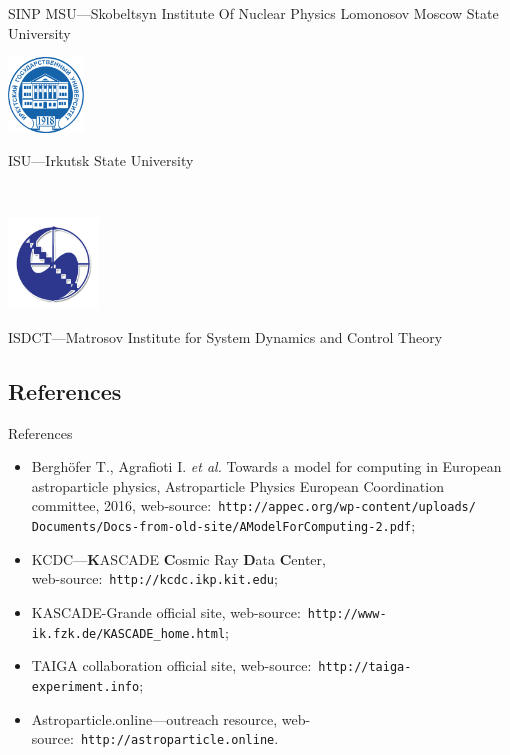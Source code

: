 \documentclass[18pt]{beamer}
\begin{document}
\begin{frame}[allowframebreaks]
{  SINP MSU---Skobeltsyn Institute Of Nuclear Physics Lomonosov Moscow State University
}
\\\vspace{1em}
\parbox{0.20\textwidth}{
  \centering\includegraphics[width=0.15\textwidth]{pics/isu_logo.png}
}\hfill
\parbox{0.75\textwidth}{
  ISU---Irkutsk State University
}
\\\vspace{1em}
\parbox{0.20\textwidth}{
  \centering\includegraphics[width=0.18\textwidth]{pics/matr_logo.png}
}\hfill
\parbox{0.75\textwidth}{
  ISDCT---Matrosov Institute for System Dynamics and Control Theory
}
\end{frame}

\subsection{References}
\begin{frame}{References}
  \begin{itemize}
   \item Berghöfer T., Agrafioti I. \textit{et al.} Towards a model for computing in European astroparticle physics,
   Astroparticle Physics European Coordination committee, 2016,
   web-source:~\texttt{http://appec.org/wp-content/uploads/\\Documents/Docs-from-old-site/AModelForComputing-2.pdf};
   \item KCDC---\textbf{K}ASCADE \textbf{C}osmic Ray \textbf{D}ata \textbf{C}enter,\\
   web-source:~\texttt{http://kcdc.ikp.kit.edu};
   \item KASCADE-Grande official site, web-source:~\texttt{http://www-ik.fzk.de/KASCADE\_home.html};
   \item TAIGA collaboration official site, web-source:~\texttt{http://taiga-experiment.info};
   \item Astroparticle.online---outreach resource, web-source:~\texttt{http://astroparticle.online}.

  \end{itemize}

\end{frame}



\backupend
\end{document}
